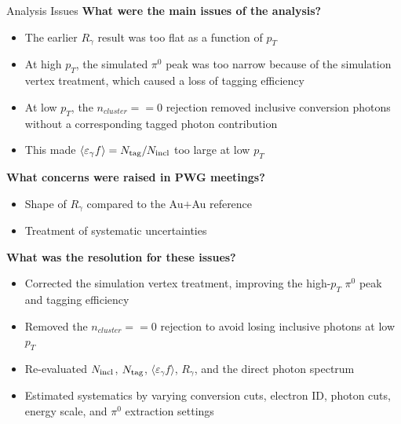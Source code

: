 \documentclass[10pt, dvipsnames]{beamer}
\begin{document}
\begin{frame}{Analysis Issues}
   \textbf{What were the main issues of the analysis?} \break
   \begin{itemize}
      \item[$\bullet$] The earlier $R_\gamma$ result was too flat as a function of $p_T$
      \item[$\bullet$] At high $p_T$, the simulated $\pi^0$ peak was too narrow because of the simulation vertex treatment, which caused a loss of tagging efficiency
      \item[$\bullet$] At low $p_T$, the ${n_{cluster} == 0}$ rejection removed inclusive conversion photons without a corresponding tagged photon contribution
      \item[$\bullet$] This made $\langle\varepsilon_\gamma f\rangle = N_{\rm tag}/N_{\rm incl}$ too large at low $p_T$
   \end{itemize}

   \textbf{What concerns were raised in PWG meetings?}
   \begin{itemize}
      \item[$\bullet$] Shape of $R_\gamma$ compared to the Au$+$Au reference
      \item[$\bullet$] Treatment of systematic uncertainties
   \end{itemize}

   \textbf{What was the resolution for these issues?}
   \begin{itemize}
      \item[$\bullet$] Corrected the simulation vertex treatment, improving the high-$p_T$ $\pi^0$ peak and tagging efficiency
      \item[$\bullet$] Removed the ${n_{cluster} == 0}$ rejection to avoid losing inclusive photons at low $p_T$
      \item[$\bullet$] Re-evaluated $N_{\rm incl}$, $N_{\rm tag}$, $\langle\varepsilon_\gamma f\rangle$, $R_\gamma$, and the direct photon spectrum
      \item[$\bullet$] Estimated systematics by varying conversion cuts, electron ID, photon cuts, energy scale, and $\pi^0$ extraction settings
   \end{itemize}
\end{frame}
\end{document}
